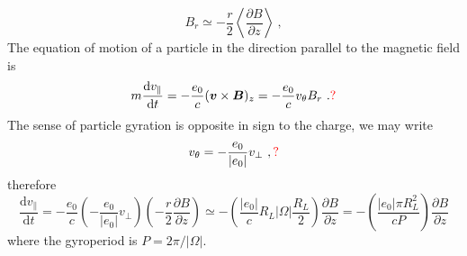 \documentclass[12pt,a4paper]{article}
\renewcommand{\vec}[1]{\boldsymbol{#1}}
\newcommand{\dif}{\mathrm{d}}
\begin{document}
\begin{equation*}
B_r \simeq -\frac{r}{2} \left\langle \frac{\partial B}{\partial z} \right\rangle ~,
\end{equation*}
The equation of motion of a particle in the direction parallel to the magnetic field is
\begin{equation*}
m \frac{\dif v_\parallel}{\dif t} = -\frac{e_0}{c} (\vec{v} \times \vec{B})_z = -\frac{e_0}{c} v_\theta B_r ~. \color{red} ?
\end{equation*}
The sense of particle gyration is opposite in sign to the charge, we may write
\begin{equation*}
v_\theta = -\frac{e_0}{|e_0|} v_\perp ~, \color{red} ?
\end{equation*}
therefore
\begin{equation*}
\frac{\dif v_\parallel}{\dif t} = -\frac{e_0}{c} \left( -\frac{e_0}{|e_0|} v_\perp \right) \left(-\frac{r}{2} \frac{\partial B}{\partial z} \right) \simeq -\left(\frac{|e_0|}{c} R_L |\Omega| \frac{R_L}{2} \right) \frac{\partial B}{\partial z} = -\left(\frac{|e_0| \pi R_L^2}{cP} \right) \frac{\partial B}{\partial z} 
\end{equation*}
where the gyroperiod is $P = 2\pi/|\Omega|$.
\end{document}

